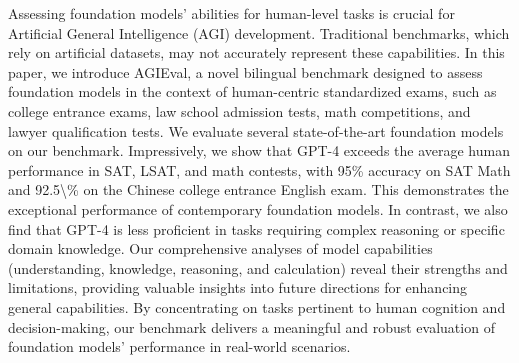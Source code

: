 Assessing foundation models' abilities for human-level tasks is crucial for Artificial General Intelligence (AGI) development. Traditional benchmarks, which rely on artificial datasets, may not accurately represent these capabilities. In this paper, we introduce AGIEval, a novel bilingual benchmark designed to assess foundation models in the context of human-centric standardized exams, such as college entrance exams, law school admission tests, math competitions, and lawyer qualification tests.  We evaluate several state-of-the-art foundation models on our benchmark.  Impressively, we show that GPT-4 exceeds the average human performance in SAT, LSAT, and math contests, with 95\% accuracy on SAT Math and 92.5\textbackslash{}\% on the Chinese college entrance English exam. This demonstrates the exceptional performance of contemporary foundation models.  In contrast, we also find that GPT-4 is less proficient in tasks requiring complex reasoning or specific domain knowledge. Our comprehensive analyses of model capabilities (understanding, knowledge, reasoning, and calculation) reveal their strengths and limitations, providing valuable insights into future directions for enhancing general capabilities. By concentrating on tasks pertinent to human cognition and decision-making, our benchmark delivers a meaningful and robust evaluation of foundation models' performance in real-world scenarios.